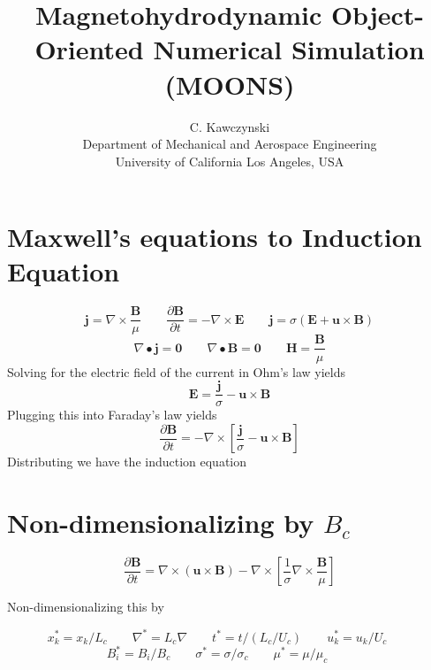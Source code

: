\documentclass[11pt]{article}
\begin{document}
\doublespacing
\title{Magnetohydrodynamic Object-Oriented Numerical Simulation (MOONS)}
\author{C. Kawczynski \\
Department of Mechanical and Aerospace Engineering \\
University of California Los Angeles, USA\\
}
\maketitle

\section{Maxwell's equations to Induction Equation}
\begin{equation}
	\pmb{j} = \nabla \times \frac{\pmb{B}}{\mu}
	\qquad
	\frac{\partial \pmb{B}}{\partial t} = 
	- \nabla \times \pmb{E}
	\qquad
	\pmb{j} = \sigma (\pmb{E} + \pmb{u}\times \pmb{B})
\end{equation}
\begin{equation}
	\nabla \bullet \pmb{j} = \pmb{0}
	\qquad
	\nabla \bullet \pmb{B} = \pmb{0}
	\qquad
	\pmb{H} = \frac{\pmb{B}}{\mu}
\end{equation}
Solving for the electric field of the current in Ohm's law yields
\begin{equation}
	\pmb{E} = \frac{\pmb{j}}{\sigma} - \pmb{u} \times \pmb{B}
\end{equation}
Plugging this into Faraday's law yields
\begin{equation}
	\frac{\partial \pmb{B}}{\partial t} = 
	- \nabla \times \left[ \frac{\pmb{j}}{\sigma}
	- \pmb{u} \times \pmb{B} \right]
\end{equation}
Distributing we have the induction equation

\section{Non-dimensionalizing by \texorpdfstring{$B_c$}{LG}}

\begin{equation}
	\frac{\partial \pmb{B}}{\partial t} = 
	\nabla \times (\pmb{u} \times \pmb{B})
	- \nabla \times 
	\left[ \frac{1}{\sigma}
	\nabla \times \frac{\pmb{B}}{\mu} \right]
\end{equation}

Non-dimensionalizing this by

\begin{equation*}
	x_k^* = x_k/L_c \qquad
	\nabla^* = L_c \nabla \qquad
	t^* = t/(L_c/U_c) \qquad
	u_k^* = u_k/U_c \qquad
	\end{equation*}
	\begin{equation*}
	B_i^* = B_i/B_c  \qquad
	\sigma^* = \sigma/\sigma_c \qquad
	\mu^* = \mu/\mu_c \qquad
\end{equation*}
\end{document}
